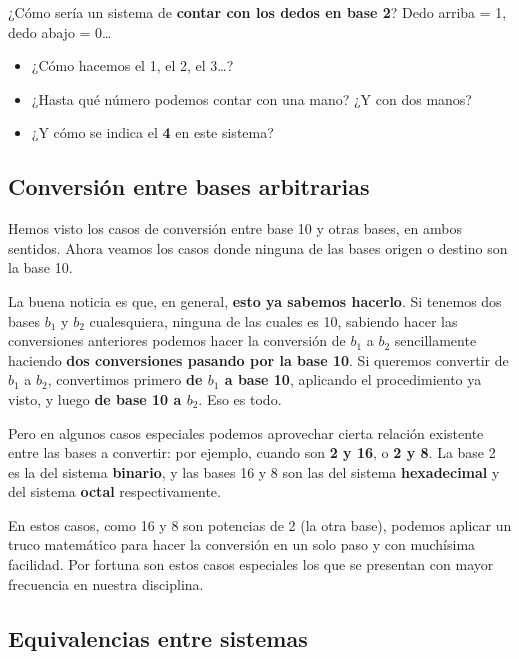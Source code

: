 \documentclass[spanish,A4,]{article}
\begin{document}
¿Cómo sería un sistema de \textbf{contar con los dedos en base 2}? Dedo
arriba = 1, dedo abajo = 0\ldots{}

\begin{itemize}
\itemsep1pt\parskip0pt
\item
  ¿Cómo hacemos el 1, el 2, el 3\ldots{}?
\item
  ¿Hasta qué número podemos contar con una mano? ¿Y con dos manos?
\item
  ¿Y cómo se indica el \textbf{4} en este sistema?
\end{itemize}

\subsection{Conversión entre bases
arbitrarias}\label{conversiuxf3n-entre-bases-arbitrarias}

Hemos visto los casos de conversión entre base 10 y otras bases, en
ambos sentidos. Ahora veamos los casos donde ninguna de las bases origen
o destino son la base 10.

La buena noticia es que, en general, \textbf{esto ya sabemos hacerlo}.
Si tenemos dos bases $b_1$ y $b_2$ cualesquiera, ninguna de las cuales
es 10, sabiendo hacer las conversiones anteriores podemos hacer la
conversión de $b_1$ a $b_2$ sencillamente haciendo \textbf{dos
conversiones pasando por la base 10}. Si queremos convertir de $b_1$ a
$b_2$, convertimos primero \textbf{de $b_1$ a base 10}, aplicando el
procedimiento ya visto, y luego \textbf{de base 10 a $b_2$}. Eso es
todo.

Pero en algunos casos especiales podemos aprovechar cierta relación
existente entre las bases a convertir: por ejemplo, cuando son \textbf{2
y 16}, o \textbf{2 y 8}. La base 2 es la del sistema \textbf{binario}, y
las bases 16 y 8 son las del sistema \textbf{hexadecimal} y del sistema
\textbf{octal} respectivamente.

En estos casos, como 16 y 8 son potencias de 2 (la otra base), podemos
aplicar un truco matemático para hacer la conversión en un solo paso y
con muchísima facilidad. Por fortuna son estos casos especiales los que
se presentan con mayor frecuencia en nuestra disciplina.

\subsection{Equivalencias entre
sistemas}\label{equivalencias-entre-sistemas}
\end{document}
